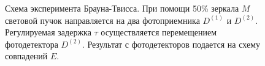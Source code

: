 \begin{figure}
\centering



\caption{Схема эксперимента Брауна-Твисса. При
  помощи 50\% зеркала $M$ световой пучок направляется на два
  фотоприемника $D^{(1)}$ и $D^{(2)}$. Регулируемая задержка $\tau$
  осуществляется перемещением фотодетектора $D^{(2)}$. Результат с
  фотодетекторов подается на схему совпадений $E$.}
\label{figPart3Nonclass2}
\end{figure}
